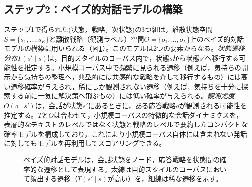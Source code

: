 \documentclass[manuscript,review,anonymous]{acmart}
\begin{document}
\subsection{ステップ2：ベイズ的対話モデルの構築}
\label{sec:bayesmodel}
ステップ1で得られた(状態，戦略，次状態)の3つ組は，離散状態空間$S=\{s_1,\dots,s_K\}$と離散戦略（観測ラベル）空間$O=\{o_1,\dots,o_L\}$上のベイズ的対話モデルの構築に用いられる（図\ref{fig:bayesmodel}）。このモデルは2つの要素からなる。\emph{状態遷移分布}$T(s'\mid s)$は，目的スタイルのコーパス内で，状態$s$から状態$s'$へ移行する可能性を推定する。小規模コーパス中で頻繁に見られる遷移（例えば，気持ちの開示から気持ちの整理へ，典型的には共感的な戦略を介して移行するもの）には高い遷移確率が与えられ，稀にしか観測されない遷移（例えば，気持ちを十分に探索する前に一気に解決策へ飛ぶもの）には低い確率が与えられる。\emph{観測尤度}$O(o\mid s')$は，会話が状態$s'$にあるときに，ある応答戦略$o$が観測される可能性を推定する。$T$と$O$は合わせて，小規模コーパスの特徴的な会話ダイナミクスを，表層的なテキストのレベルではなく状態と戦略のレベルで要約したコンパクトな確率モデルを構成しており，これにより小規模コーパス自体には含まれない発話に対してもモデルを再利用してスコアリングできる。

\begin{figure}[t]
  \centering
  \caption{ベイズ的対話モデルは，会話状態をノード，応答戦略を状態間の確率的な遷移として表現する。太線は目的スタイルのコーパスにおいて頻出する遷移（$T(s'\mid s)$が高い）を，細線は稀な遷移を示す。}
  \label{fig:bayesmodel}
\end{figure}
\end{document}
